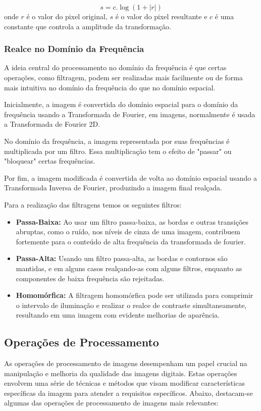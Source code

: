 \documentclass[conference]{IEEEtran}
\begin{document}
\begin{equation}
s = c . \log(1 + |r|)
\label{eq:ecl_din}
\end{equation}
onde $r$ é o valor do pixel original, $s$ é o valor do pixel resultante e $c$ é uma constante que 
controla a amplitude da transformação.

\subsubsection{Realce no Domínio da Frequência}
A ideia central do processamento no domínio da frequência é que certas operações, como filtragem, 
podem ser realizadas mais facilmente ou de forma mais intuitiva no domínio da frequência do que no domínio espacial.
\cite{gonzalez2000}

Inicialmente, a imagem é convertida do domínio espacial para o domínio da frequência usando a 
Transformada de Fourier, em imagens, normalmente é usada a Transformada de Fourier 2D.

No domínio da frequência, a imagem representada por suas frequências é multiplicada por um filtro. 
Essa multiplicação tem o efeito de "passar" ou "bloquear" certas frequências.

Por fim, a imagem modificada é convertida de volta ao domínio espacial usando a Transformada Inversa de Fourier, 
produzindo a imagem final realçada.

Para a realização das filtragens temos os seguintes filtros:
\begin{itemize}
    \item {\textbf{Passa-Baixa:}}
    Ao usar um filtro passa-baixa, as bordas e outras transições abruptas, como o ruído, nos níveis de cinza de uma 
    imagem, contribuem fortemente para o conteúdo de alta frequência da transformada de fourier.
    
    \item {\textbf{Passa-Alta:}}
    Usando um filtro passa-alta, as bordas e contornos são mantidas, e em alguns casos realçando-as com alguns 
    filtros, enquanto as componentes de baixa frequência são rejeitadas.
    
    \item {\textbf{Homomórfica:}}
    A filtragem homomórfica pode ser utilizada para comprimir o intervalo de iluminação e realizar o realce de 
    contraste simultaneamente, resultando em uma imagem com evidente melhorias de aparência.
\end{itemize}

\subsection{Operações de Processamento}
As operações de processamento de imagens desempenham um papel crucial na manipulação e melhoria 
da qualidade das imagens digitais. Estas operações envolvem uma série de técnicas e métodos que 
visam modificar características específicas da imagem para atender a requisitos específicos. 
Abaixo, destacam-se algumas das operações de processamento de imagens mais relevantes:
\end{document}
